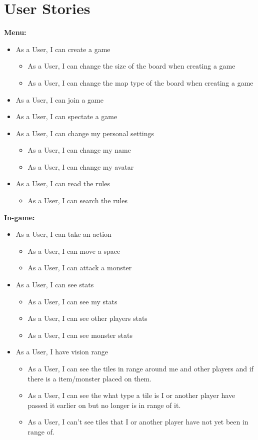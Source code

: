 \section{User Stories}

\textbf{Menu:}
	\begin{itemize}
		\item As a User, I can create a game
		\begin{itemize}
			\item As a User, I can change the size of the board when creating a game
			\item As a User, I can change the map type of the board when creating a game
		\end{itemize}
		\item As a User, I can join a game
		\item As a User, I can spectate a game
		\item As a User, I can change my personal settings
		\begin{itemize}
			\item As a User, I can change my name
			\item As a User, I can change my avatar
		\end{itemize}
		\item As a User, I can read the rules
		\begin{itemize}
			\item As a User, I can search the rules
		\end{itemize}
	\end{itemize}

	\textbf{In-game:}
	\begin{itemize}	
		
		\item As a User, I can take an action
		\begin{itemize}
			\item As a User, I can move a space
			\item As a User, I can attack a monster
		\end{itemize}
		
		\item As a User, I can see stats
		\begin{itemize}
			\item As a User, I can see my stats
			\item As a User, I can see other players stats
			\item As a User, I can see monster stats
		\end{itemize}
		\item As a User, I have vision range
		\begin{itemize}
			\item As a User, I can see the tiles in range around me and other players and if there is a item/monster placed on them.
			\item As a User, I can see the what type a tile is I or another player have passed it earlier on but no longer is in range of it.
			\item As a User, I can't see tiles that I or another player have not yet been in range of.
		\end{itemize}
	\end{itemize}